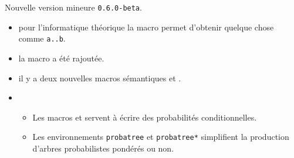 Nouvelle version mineure \verb+0.6.0-beta+.

\begin{itemize}[itemsep=.5em]
    \item {}
    	  pour l'informatique théorique la macro  permet d'obtenir quelque chose comme \verb+a..b+.




    \item {}
          la macro  a été rajoutée.




    \item {}
          il y a deux nouvelles macros sémantiques  et .




    \item {}
    \begin{itemize}[itemsep=.5em]
        \item Les macros  et  servent à écrire des probabilités conditionnelles.

        \item Les environnements \verb+probatree+ et \verb+probatree*+ simplifient la production d'arbres probabilistes pondérés ou non.
    \end{itemize}
\end{itemize}
